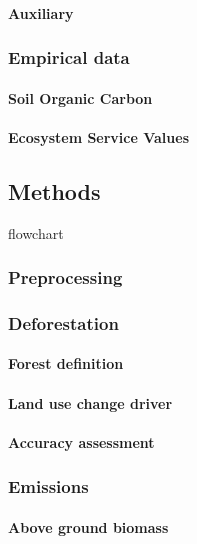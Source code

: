		\paragraph{Auxiliary}

	\subsubsection{Empirical data}
		\paragraph{Soil Organic Carbon}
		\paragraph{Ecosystem Service Values}


\subsection{Methods}
\label{subsec:methods}

	{\color{red} flowchart} 

	\subsubsection{Preprocessing}

	\subsubsection{Deforestation}
		\paragraph{Forest definition}
		\paragraph{Land use change driver}
		\paragraph{Accuracy assessment}

	\subsubsection{Emissions}
		\paragraph{Above ground biomass}
